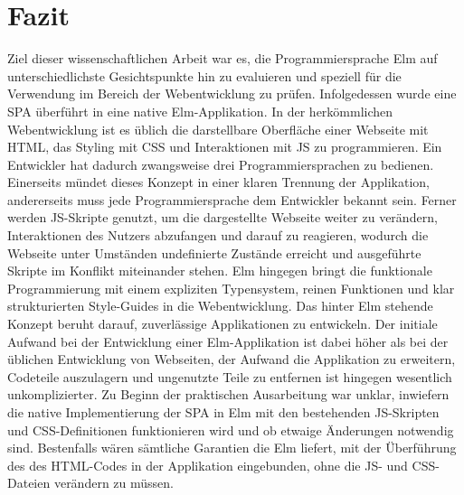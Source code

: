 \chapter{Fazit}
\label{chap:fazit}
Ziel dieser wissenschaftlichen Arbeit war es, die Programmiersprache Elm auf unterschiedlichste Gesichtspunkte hin zu evaluieren und speziell für die Verwendung im Bereich der Webentwicklung zu prüfen. Infolgedessen wurde eine \ac{SPA} überführt in eine native Elm-Applikation. In der herkömmlichen Webentwicklung ist es üblich die darstellbare Oberfläche einer Webseite mit \ac{HTML}, das Styling mit \ac{CSS} und Interaktionen mit \ac{JS} zu programmieren. Ein Entwickler hat dadurch zwangsweise drei Programmiersprachen zu bedienen. Einerseits mündet dieses Konzept in einer klaren Trennung der Applikation, andererseits muss jede Programmiersprache dem Entwickler bekannt sein. Ferner werden \ac{JS}-Skripte genutzt, um die dargestellte Webseite weiter zu verändern, Interaktionen des Nutzers abzufangen und darauf zu reagieren, wodurch die Webseite unter Umständen undefinierte Zustände erreicht und ausgeführte Skripte im Konflikt miteinander stehen.
Elm hingegen bringt die funktionale Programmierung mit einem expliziten Typensystem, reinen Funktionen und klar strukturierten Style-Guides in die Webentwicklung. Das hinter Elm stehende Konzept beruht darauf, zuverlässige Applikationen zu entwickeln. Der initiale Aufwand bei der Entwicklung einer Elm-Applikation ist dabei höher als bei der üblichen Entwicklung von Webseiten, der Aufwand die Applikation zu erweitern, Codeteile auszulagern und ungenutzte Teile zu entfernen ist hingegen wesentlich unkomplizierter.
Zu Beginn der praktischen Ausarbeitung war unklar, inwiefern die native Implementierung der \ac{SPA} in Elm mit den bestehenden \ac{JS}-Skripten und \ac{CSS}-Definitionen funktionieren wird und ob etwaige Änderungen notwendig sind. Bestenfalls wären sämtliche Garantien die Elm liefert, mit der Überführung des des \ac{HTML}-Codes in der Applikation eingebunden, ohne die \ac{JS}- und \ac{CSS}-Dateien verändern zu müssen.
